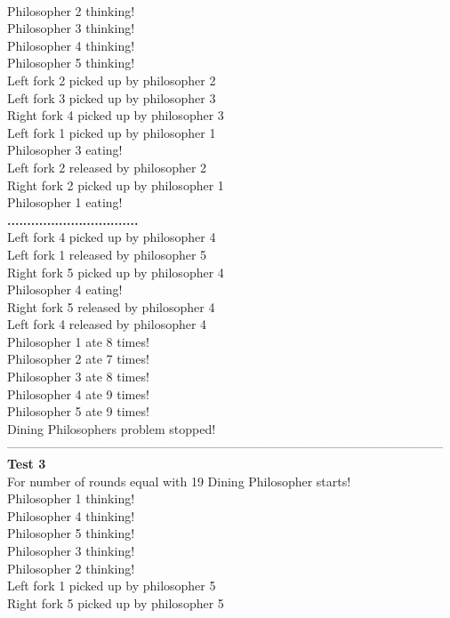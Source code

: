 \documentclass[14pt]{article}
\begin{document}
\\Philosopher 2 thinking!
\\Philosopher 3 thinking!
\\Philosopher 4 thinking!
\\Philosopher 5 thinking!
\\Left fork 2 picked up by philosopher 2
\\Left fork 3 picked up by philosopher 3
\\Right fork 4 picked up by philosopher 3
\\Left fork 1 picked up by philosopher 1
\\Philosopher 3 eating!
\\Left fork 2 released by philosopher 2
\\Right fork 2 picked up by philosopher 1
\\Philosopher 1 eating!
\\\textbf{.................................}
\\Left fork 4 picked up by philosopher 4
\\Left fork 1 released by philosopher 5
\\Right fork 5 picked up by philosopher 4
\\Philosopher 4 eating!
\\Right fork 5 released by philosopher 4
\\Left fork 4 released by philosopher 4
\\Philosopher 1 ate 8 times!
\\Philosopher 2 ate 7 times!
\\Philosopher 3 ate 8 times!
\\Philosopher 4 ate 9 times!
\\Philosopher 5 ate 9 times!
\\Dining Philosophers problem stopped!
\\---------------------------------------------------------------------------------------------------------
\\\textbf{Test 3}
\\For number of rounds equal with 19 Dining Philosopher starts!
\\Philosopher 1 thinking!
\\Philosopher 4 thinking!
\\Philosopher 5 thinking!
\\Philosopher 3 thinking!
\\Philosopher 2 thinking!
\\Left fork 1 picked up by philosopher 5
\\Right fork 5 picked up by philosopher 5
\end{document}
